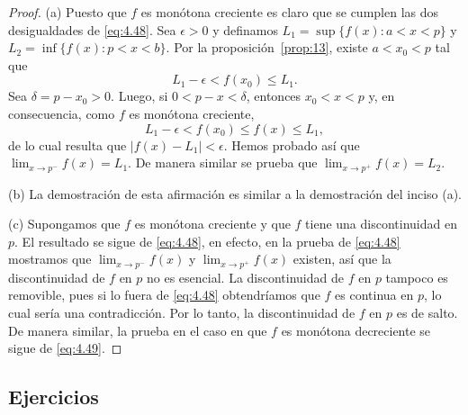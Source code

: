 \documentclass[12pt,a4paper]{book}
\begin{document}
    \begin{proof}
        (a) Puesto que $f$ es monótona creciente es claro que se
        cumplen las dos desigualdades de \eqref{eq:4.48}. Sea $\epsilon>0$ y definamos $L_{1}=
        \sup\{f(x):a<x<p\}$ y $L_{2}=\inf\{f(x):p<x<b\}$. Por la proposición~\ref{prop:13},
        existe $a<x_{0}<p$ tal que
        \begin{equation*}
            L_{1}-\epsilon<f(x_{0})\leq L_{1}.
        \end{equation*}
        Sea $\delta=p-x_{0}>0$. Luego, si $0<p-x<\delta$, entonces $x_{0}<x<p$ y, en
        consecuencia, como $f$ es monótona creciente,
        \begin{equation*}
            L_{1}-\epsilon<f(x_{0})\leq f(x)\leq L_{1},
        \end{equation*}
        de lo cual resulta que $|f(x)-L_{1}|<\epsilon$. Hemos probado así que $\lim_{x\to p^{-}}f(x)=
        L_{1}$. De manera similar se prueba que $\lim_{x\to p^{+}}f(x)=L_{2}$.

        (b) La demostración de esta afirmación es similar a la demostración del
        inciso (a).

        (c) Supongamos que $f$ es monótona creciente y que $f$ tiene una discontinuidad
        en $p$. El resultado se sigue de \eqref{eq:4.48}, en efecto, en la prueba de
        \eqref{eq:4.48} mostramos que $\lim_{x\to p^{-}}f(x)$ y $\lim_{x\to p^{+}}f(x)$ existen, así que la
        discontinuidad de $f$ en $p$ no es esencial. La discontinuidad de $f$ en $p$ tampoco
        es removible, pues si lo fuera de \eqref{eq:4.48} obtendríamos que $f$ es continua en
        $p$, lo cual sería una contradicción. Por lo tanto, la discontinuidad de $f$ en $p$
        es de salto. De manera similar, la prueba en el caso en que $f$ es monótona
        decreciente se sigue de \eqref{eq:4.49}.
    \end{proof}

    \par{}\subsection*{Ejercicios}
\end{document}
